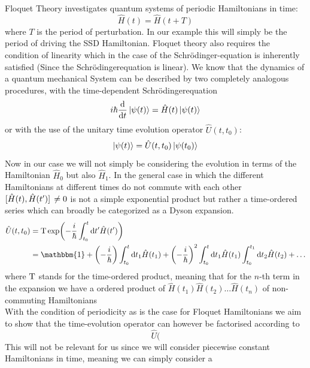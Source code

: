 \documentclass[11pt, a4paper]{article}
\theoremstyle{definition} %
\begin{document}
	Floquet Theory investigates quantum systems of periodic Hamiltonians in time: 
	\begin{equation}
		\hat{H}(t) = \hat{H}(t+ T)
	\end{equation}
	where $T$ is the period of perturbation. In our example this will simply be the period of driving the SSD Hamiltonian. Floquet theory also requires the condition of linearity which in the case of the Schrödinger-equation is inherently satisfied (Since the Schrödingerequation is linear). We know that the dynamics of a quantum mechanical System can be described by two completely analogous procedures, with the time-dependent Schrödingerequation
	\begin{equation}
		i\hbar \dv{t} \ket{\psi(t)} = \hat{H}(t) \ket{\psi(t)}
	\end{equation}
	or with the use of the unitary time evolution operator $\hat{U}(t,t_0)$:
	\begin{equation}
		\ket{\psi(t)} = \hat{U}(t,t_0) \ket{\psi(t_0)}
	\end{equation}
	Now in our case we will not simply be considering the evolution in terms of the Hamiltonian $\hat{H}_0$ but also $\hat{H}_1$. In the general case in which the different Hamiltonians at different times do not commute with each other $\comm*{\hat{H}(t)}{\hat{H}(t')} \neq 0$ is not a simple exponential product but rather a time-ordered series which can broadly be categorized as a Dyson expansion. 
	\begin{align}
	\hat{U}(t,t_0) &= \textup{T} \exp(	-\frac{i}{\hbar} \int_{t_0}^t \dd t' \hat{H}(t'))\\
	&= \mathbbm{1} + \left(- \frac{i}{\hbar}\right) \int_{t_0}^t \dd t_1 \hat{H}(t_1) + \left(-\frac{i}{\hbar}\right)^2 \int_{t_0}^t \dd t_1 \hat{H}(t_1) \int_{t_0}^{t_1} \dd t_2 \hat{H}(t_2) + \dots
	\end{align}
	where $\textup{T}$ stands for the time-ordered product, meaning that for the $n$-th term in the expansion we have a ordered product of $\hat{H}(t_1)\hat{H}(t_2)\dots \hat{H}(t_n)$ of non-commuting Hamiltonians\\
	
	
With the condition of periodicity as is the case for Floquet Hamiltonians we aim to show that the time-evolution operator can however be factorised according to
	\begin{equation}
		\hat{U}(
	\end{equation}
	This will not be relevant for us since we will consider piecewise constant Hamiltonians in time, meaning we can simply consider a 
	
\end{document}
